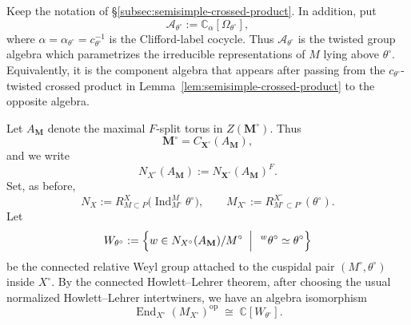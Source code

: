 \documentclass{amsart}
\theoremstyle{plain}
\numberwithin{equation}{section}
\theoremstyle{definition}
\newcommand{\op}{\operatorname{op}}
\newcommand{\Ind}{\operatorname{Ind}}
\newcommand{\End}{\operatorname{End}}
\newcommand{\cA}{\mathcal{A}}
\newcommand{\bM}{\mathbf{M}}
\newcommand{\bX}{\mathbf{X}}
\newcommand{\C}{\mathbb{C}}
\begin{document}
Keep the notation of \S\ref{subsec:semisimple-crossed-product}.  In addition, put
\[
\cA_{\theta^\circ}:=\C_\alpha[\Omega_{\theta^\circ}],
\]
where \(\alpha=\alpha_{\theta^\circ}=c_{\theta^\circ}^{-1}\) is the
Clifford-label cocycle.  Thus \(\cA_{\theta^\circ}\) is the twisted group algebra
which parametrizes the irreducible representations of \(M\) lying above
\(\theta^\circ\).  Equivalently, it is the component algebra that appears after
passing from the \(c_{\theta^\circ}\)-twisted crossed product in
Lemma~\ref{lem:semisimple-crossed-product} to the opposite algebra.

Let \(A_{\bM}\) denote the maximal \(F\)-split torus in \(Z(\bM^\circ)\).  Thus
\[
\bM^\circ=C_{\bX^\circ}(A_{\bM}),
\]
and we write
\[
N_{X^\circ}(A_{\bM}):=N_{\bX^\circ}(A_{\bM})^F .
\]
Set, as before,
\[
N_X:=R^X_{M\subset P}\!\bigl(\Ind_{M^\circ}^{M}\theta^\circ\bigr),
\qquad
M_{X^\circ}:=R^{X^\circ}_{M^\circ\subset P^\circ}(\theta^\circ).
\]
Let
\[
W_{\theta^\circ}
:=
\Bigl\{
w\in N_{X^\circ}(A_{\bM})/M^\circ
\;\Bigm|\;
{}^{\,w}\theta^\circ\simeq \theta^\circ
\Bigr\}
\]
be the connected relative Weyl group attached to the cuspidal pair
\((M^\circ,\theta^\circ)\) inside \(X^\circ\).  By the connected
Howlett--Lehrer theorem, after choosing the usual normalized
Howlett--Lehrer intertwiners, we have an algebra isomorphism
\[
\End_{X^\circ}(M_{X^\circ})^{\op}\;\cong\;\C[W_{\theta^\circ}].
\]
\end{document}
